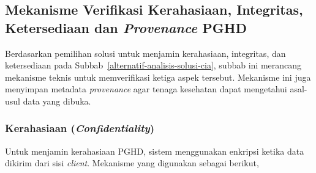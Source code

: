 \subsection{Mekanisme Verifikasi Kerahasiaan, Integritas, Ketersediaan dan \textit{Provenance} PGHD}\label{mekanisme-verifikasi-cia}

Berdasarkan pemilihan solusi untuk menjamin kerahasiaan, integritas, dan ketersediaan pada Subbab~\ref{alternatif-analisis-solusi-cia}, subbab ini merancang mekanisme teknis untuk memverifikasi ketiga aspek tersebut.
Mekanisme ini juga menyimpan metadata \textit{provenance} agar tenaga kesehatan dapat mengetahui asal-usul data yang dibuka.

\subsubsection{Kerahasiaan (\textit{Confidentiality})}

Untuk menjamin kerahasiaan PGHD, sistem menggunakan enkripsi ketika data dikirim dari sisi \textit{client}.
Mekanisme yang digunakan sebagai berikut,

